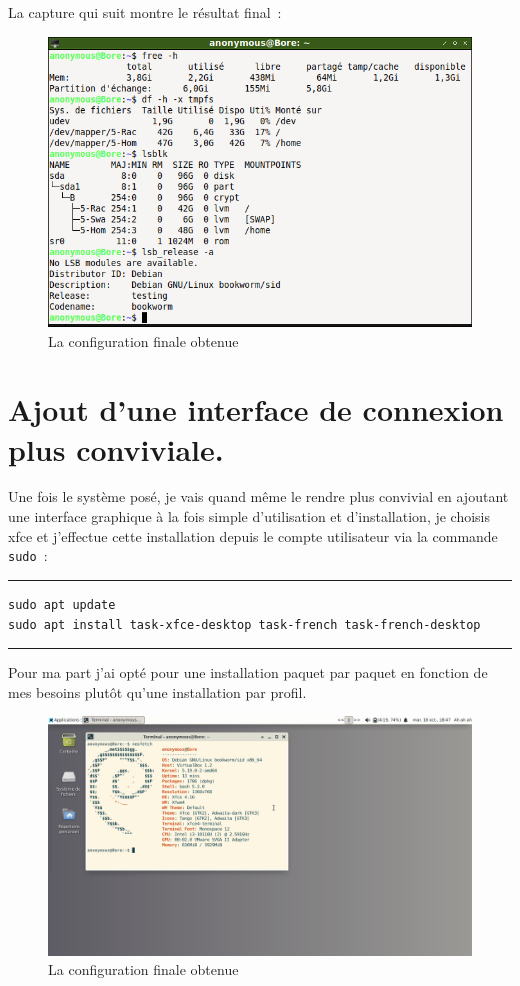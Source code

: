 \documentclass[12pt, a4paper]{report}
\begin{document}
La capture qui suit montre le résultat final~: 
\begin{figure}
	\centering
	\includegraphics{terminal-final.png}
	\caption{La configuration finale obtenue}
\end{figure}

\section{Ajout d'une interface de connexion plus conviviale.}
Une fois le système posé, je vais quand même le rendre plus convivial en ajoutant une interface graphique à la fois simple d'utilisation et d'installation, je choisis xfce et j'effectue cette installation depuis le compte utilisateur via la commande \texttt{sudo}~:

\noindent \rule{\linewidth}{0.5pt}
\begin{verbatim}
sudo apt update
sudo apt install task-xfce-desktop task-french task-french-desktop
\end{verbatim}
\rule{\linewidth}{0.5pt}

Pour ma part j'ai opté pour une installation paquet par paquet en fonction de mes besoins plutôt qu'une installation par profil.
\begin{figure}
	\centering
	\includegraphics{xfce-desktop.png}
	\caption{La configuration finale obtenue}
\end{figure}
\end{document}
